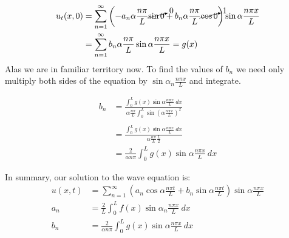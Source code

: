\begin{align*}
u_t(x,0) &= \sum\limits_{n=1}^{\infty}\left(-a_n\alpha \frac{n \pi}{L} \cancelto{0}{\sin{0}} + b_n\alpha \frac{n \pi}{L} \cancelto{1}{\cos{0}} \right) \sin{\alpha \frac{n \pi x}{L}} \\
&=\sum\limits_{n=1}^{\infty} b_n \alpha \frac{n \pi}{L} \sin{\alpha \frac{n \pi x}{L}} = g(x)
\end{align*}
Alas we are in familiar territory now.  To find the values of $b_n$ we need only multiply both sides of the equation by $\sin{\alpha_n \frac{n \pi x}{L}}$ and integrate.

\begin{align*}
b_n &= \frac{\int_{0}^{L} g(x) \sin{\alpha \frac{n \pi x}{L}} \ dx }{\alpha \frac{n \pi}{L}\int_{0}^{L} \sin{\left(\alpha \frac{n \pi x}{L} \right)}^2} \\
& \\
&= \frac{\int_{0}^{L} g(x) \sin{\alpha \frac{n \pi x}{L}} \ dx }{\alpha \frac{n \pi}{L}\frac{L}{2}} \\
&= \frac{2}{\alpha n \pi} \int_{0}^{L} g(x) \sin{\alpha \frac{n \pi x}{L}} \ dx
\end{align*}  

\vspace{0.25cm}
\noindent In summary, our solution to the wave equation is:
\begin{align*}
u(x,t) &= \sum\limits_{n=1}^{\infty} \left(a_n \cos{\alpha \frac{n \pi t}{L}} + b_n \sin{\alpha \frac{n \pi t}{L}} \right) \sin{\alpha \frac{n \pi x}{L}} \\
a_n &= \frac{2}{L} \int_{0}^{L} f(x) \sin{\alpha_n \frac{n \pi x}{L}} \ dx \\
b_n &= \frac{2}{\alpha n \pi} \int_{0}^{L} g(x) \sin{\alpha \frac{n \pi x}{L}} \ dx
\end{align*}

\vspace{4.0cm}

